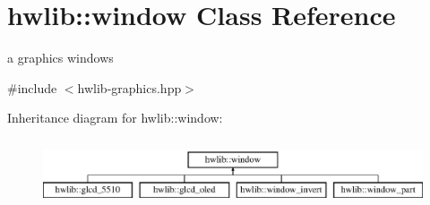 \hypertarget{classhwlib_1_1window}{}\section{hwlib\+:\+:window Class Reference}
\label{classhwlib_1_1window}


a graphics windows  




{\ttfamily \#include $<$hwlib-\/graphics.\+hpp$>$}

Inheritance diagram for hwlib\+:\+:window\+:\begin{figure}[H]
\begin{center}
\leavevmode
\includegraphics[height=2.000000cm]{classhwlib_1_1window}
\end{center}
\end{figure}
